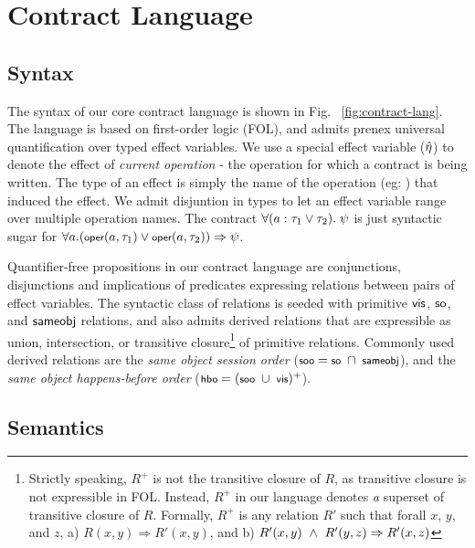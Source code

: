 \section{Contract Language}
\label{sec:lang}



\subsection{Syntax}

The syntax of our core contract language is shown in Fig.
~\ref{fig:contract-lang}. The language is based on first-order logic (FOL), and
admits prenex universal quantification over typed effect variables. We use a
special effect variable ($\hat{\eta}$) to denote the effect of \emph{current
operation} - the operation for which a contract is being written. The type of
an effect is simply the name of the operation (eg: ) that induced
the effect. We admit disjuntion in types to let an effect variable range over
multiple operation names. The contract $\small \forall (a : \tau_1 \vee
\tau_2).~\psi$ is just syntactic sugar for $\small \forall a. (\oper{a}{\tau_1}
\vee \oper{a}{\tau_2}) \Rightarrow \psi$.

Quantifier-free propositions in our contract language are conjunctions,
disjunctions and implications of predicates expressing relations between pairs
of effect variables. The syntactic class of relations is seeded with primitive
${\normalfont \textsf{vis}}$, ${\normalfont \textsf{so}}$, and ${\normalfont \textsf{sameobj}}$ relations, and also admits derived relations
that are expressible as union, intersection, or transitive
closure\footnote{Strictly speaking, $R^{+}$ is not the transitive closure of
$R$, as transitive closure is not expressible in FOL.  Instead, $R^{+}$ in our
language denotes \emph{a} superset of transitive closure of $R$. Formally,
$R^{+}$ is any relation $R'$ such that forall $x$, $y$, and $z$, a) $R(x,y)
\Rightarrow R'(x,y)$, and b) $R'(x,y) ~\wedge~ R'(y,z) \Rightarrow R'(x,z)$} of
primitive relations.  Commonly used derived relations are the \emph{same object
session order} ($\small \sooZ = \soZ ~\cap~ \sameobjZ$), and the \emph{same
object happens-before order} ($\small \hboZ = (\sooZ ~\cup~ \visZ)^+$).

\subsection{Semantics}

